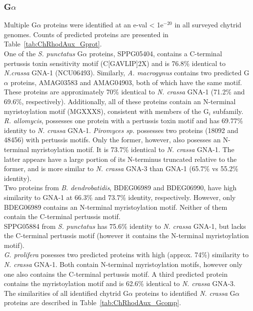 \subsubsection*{G$\alpha$}
Multiple G$\alpha$ proteins were identified at an e-val < 1e$^{-20}$ in all surveyed chytrid genomes. Counts of predicted proteins are presented in Table~\ref{tab:ChRhodAux_Gprot}.\\
\indent One of the \textit{S. punctatus} G$\alpha$ proteins, SPPG05404, contains a C-terminal pertussis toxin sensitivity motif (C[GAVLIP]{2}X) and is 76.8\% identical to \textit{N.crassa} GNA-1 (NCU06493). Similarly, \textit{A. macrogynus} contains two predicted G$\alpha$ proteins, AMAG03583 and AMAG04903, both of which have the same motif. These proteins are approximately 70\% identical to \textit{N. crassa} GNA-1 (71.2\% and 69.6\%, respectively). Additionally, all of these proteins contain an N-terminal myristoylation motif (MGXXXS), consistent with members of the G$_{i}$ subfamily. \textit{R. allomycis}, possesses one protein with a pertussis toxin motif and has 69.77\% identity to \textit{N. crassa} GNA-1. \textit{Piromyces sp.} possesses two proteins (18092 and 48456) with pertussis motifs. Only the former, however, also posesses an N-terminal myristoylation motif. It is 73.7\% identical to \textit{N. crassa} GNA-1. The latter appears have a large portion of its N-terminus truncated relative to the former, and is more similar to \textit{N. crassa} GNA-3 than GNA-1 (65.7\% vs 55.2\% identity).\\
\indent Two proteins from \textit{B. dendrobatidis}, BDEG06989 and BDEG06990, have high similarity to GNA-1 at 66.3\% and 73.7\% identity, respectively. However, only BDEG06989 contains an N-terminal myristoylation motif. Neither of them contain the C-terminal pertussis motif.\\
\indent SPPG05884 from \textit{S. punctatus} has 75.6\% identity to \textit{N. crassa} GNA-1, but lacks the C-terminal pertussis motif (however it contains the N-terminal myristoylation motif).\\
\indent \textit{G. prolifera} posesses two predicted proteins with high (approx. 74\%) similarity to \textit{N. crassa} GNA-1. Both contain N-terminal myristoylation motifs, however only one also contains the C-terminal pertussis motif. A third predicted protein contains the myristoylation motif and is 62.6\% identical to \textit{N. crassa} GNA-3.\\
\indent The similarities of all identified chytrid G$\alpha$ proteins to identified \textit{N. crassa} G$\alpha$ proteins are described in Table~\ref{tab:ChRhodAux_Gcomp}.\\
